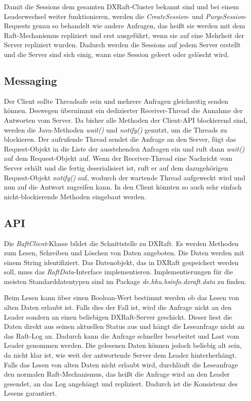 Damit die Sessions dem gesamten DXRaft-Cluster bekannt sind und bei einem Leaderwechsel weiter funktionieren, werden die \textit{CreateSession}- und \textit{PurgeSession}-Requests genau so behandelt wie andere Anfragen, das heißt sie werden mit dem Raft-Mechanismus repliziert und erst ausgeführt, wenn sie auf eine Mehrheit der Server repliziert wurden. Dadurch werden die Sessions auf jedem Server erstellt und die Server sind sich einig, wann eine Session geleert oder gelöscht wird.

\subsection{Messaging}

Der Client sollte Threadsafe sein und mehrere Anfragen gleichzeitig senden können. Deswegen übernimmt ein dedizierter Receiver-Thread die Annahme der Antworten vom Server. Da bisher alle Methoden der Client-API blockierend sind, werden die Java-Methoden \textit{wait()} und  \textit{notify()} genutzt, um die Threads zu blockieren. Der aufrufende Thread sendet die Anfrage an den Server, fügt das Request-Objekt in die Liste der ausstehenden Anfragen ein und ruft dann \textit{wait()} auf dem Request-Objekt auf. Wenn der Receiver-Thread eine Nachricht vom Server erhält und die fertig deserialisiert ist, ruft er auf dem dazugehörigen Request-Objekt \textit{notify()} auf, wodurch der wartende Thread aufgeweckt wird und nun auf die Antwort zugreifen kann. In den Client könnten so auch sehr einfach nicht-blockierende Methoden eingebaut werden.

\subsection{API}
\label{api}

Die \textit{RaftClient}-Klasse bildet die Schnittstelle zu DXRaft. Es werden Methoden zum Lesen, Schreiben und Löschen von Daten angeboten. Die Daten werden mit einem String identifiziert. Das Datenobjekt, das in DXRaft gespeichert werden soll, muss das \textit{RaftData}-Interface implementieren. Implementierungen für die meisten Standarddatentypen sind im Package \textit{de.hhu.bsinfo.dxraft.data} zu finden. 

Beim Lesen kann über einen Boolean-Wert bestimmt werden ob das Lesen von alten Daten erlaubt ist. Falls dies der Fall ist, wird die Anfrage nicht an den Leader sondern an einen beliebigen DXRaft-Server geschickt. Dieser liest die Daten direkt aus seinen aktuellen Status aus und hängt die Leseanfrage nicht an das Raft-Log an. Dadurch kann die Anfrage schneller bearbeitet und Last vom Leader genommen werden. Die gelesenen Daten können jedoch beliebig alt sein, da nicht klar ist, wie weit der antwortende Server dem Leader hinterherhängt. Falls das Lesen von alten Daten nicht erlaubt wird, durchläuft die Leseanfrage den normalen Raft-Mechanismus, das heißt die Anfrage wird an den Leader gesendet, an das Log angehängt und repliziert. Dadurch ist die Konsistenz des Lesens garantiert.

